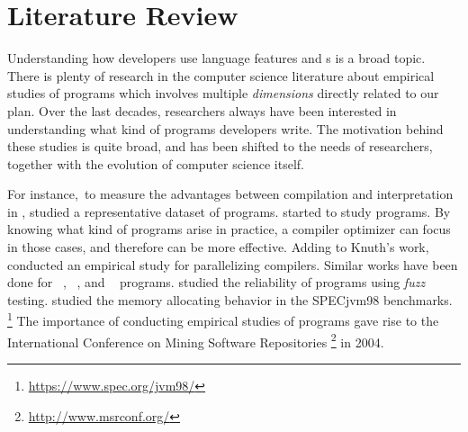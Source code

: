 



\chapter{Literature Review}
\label{cha:literature-review}

Understanding how developers use language features
and \api{}s is a broad topic.
There is plenty of research in the computer science literature about
empirical studies of programs which involves multiple \emph{dimensions}
directly related to our plan.
Over the last decades,
researchers always have been interested in understanding what
kind of programs developers write.
The motivation behind these studies is quite broad,
and has been shifted to the needs of researchers,
together with the evolution of computer science itself.

For instance,~to measure the advantages between compilation and interpretation in \basic{},
\cite{hammondBASICEvaluationProcessing1977} studied a representative dataset of programs.
\cite{knuthEmpiricalStudyFORTRAN1971} started to study \fortran{} programs.
By knowing what kind of programs arise in practice,
a compiler optimizer can focus in those cases,
and therefore can be more effective.
Adding to Knuth's work,
\cite{shenEmpiricalStudyFortran1990} conducted an empirical study for
parallelizing compilers.
Similar works have been done for
\cobol{}~\cite{salvadoriStaticProfileCOBOL1975,chevanceStaticProfileDynamic1978},
\pascal{}~\cite{cookContextualAnalysisPascal1982},
and \apl{}~\cite{saalPropertiesAPLPrograms1975,saalEmpiricalStudyAPL1977} programs.
\cite{millerEmpiricalStudyReliability1990,millerFuzzRevisitedReexamination1995,forresterEmpiricalStudyRobustness2000}
studied the reliability of programs using \emph{fuzz} testing.
\cite{dieckmannStudyAllocationBehavior1999} studied the memory allocating
behavior in the SPECjvm98 benchmarks.%
\footnote{\url{https://www.spec.org/jvm98/}}
The importance of conducting empirical studies of programs
gave rise to the
International Conference on Mining Software Repositories%
\footnote{\url{http://www.msrconf.org/}}
in 2004.

